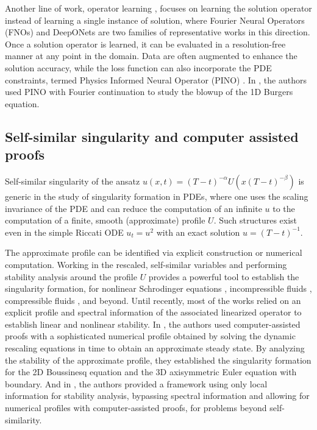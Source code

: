 \documentclass[12pt]{caltech_thesis}
\numberwithin{equation}{section}
\begin{document}
Another line of work, operator learning \cite{kovachki2023neural}, focuses on learning the solution operator instead of learning 
a single instance of solution, where Fourier Neural Operators (FNOs) \cite{li2020fourier, li2023fourier, li2023geometry, li2024scale} and DeepONets \cite{lu2021learning} are two families of representative works in this direction.
Once a solution operator is learned, it can be evaluated in a resolution-free manner at any point in the domain.
Data are often augmented to enhance the solution accuracy, while the loss function  can also incorporate
the PDE constraints, termed Physics Informed Neural Operator (PINO) \cite{li2021physics}. In \cite{maust2022fourier}, the authors used PINO with Fourier continuation 
to study the blowup of the 1D Burgers equation.
\subsection{Self-similar singularity and computer assisted proofs}
Self-similar singularity of the ansatz $u(x,t) = (T-t)^{-\alpha} U(x(T-t)^{-\beta})$
is generic in the study of singularity formation in PDEs, where 
one uses the scaling invariance of the PDE and
 can reduce the computation of an infinite $u$ to the computation of a finite, smooth (approximate) profile $U$.
Such structures exist even in the simple Riccati ODE $u_t=u^2$ with an exact solution $u=(T-t)^{-1}$.

The approximate profile can be identified via explicit construction or numerical computation. 
Working in the rescaled, self-similar variables and performing 
stability analysis around the profile $U$ provides a powerful tool to establish the singularity formation,
for nonlinear Schrodinger equations \cite{mclaughlin1986focusing, merle2005blow}, incompressible fluids \cite{elgindi2019finite,chen2019finite2,chen2021finite,chen2022stable,hou2024blowup}, compressible fluids \cite{MRRSam22a, MRRSam22b}, and beyond. 
Until recently, most of the works relied on an explicit profile and spectral information 
of the associated linearized operator to establish linear and nonlinear stability. In
\cite{chen2022stable,chen2025stable}, the authors used computer-assisted proofs with a sophisticated numerical profile obtained by solving the dynamic rescaling equations in time to obtain an approximate steady state. By analyzing the stability of the approximate profile, they established the singularity formation for the 2D Boussinesq equation
and the 3D axisymmetric Euler equation with boundary.
And in \cite{hou20242,chen2024stability}, the authors provided a framework using only local information for stability analysis,
bypassing spectral information and allowing for numerical profiles with computer-assisted proofs,
for problems beyond self-similarity.
\end{document}
